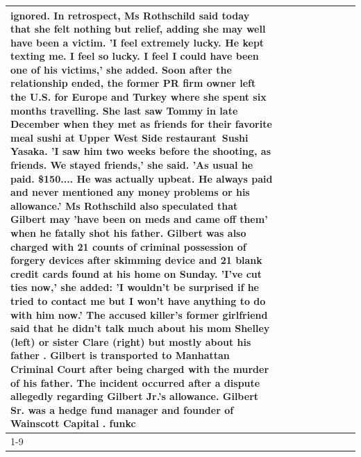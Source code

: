 \begin{table}[H]
\begin{tabular}{lllrlllll}
ignored. In retrospect, Ms Rothschild said today that she felt nothing but relief, adding she may well have been a victim. 'I feel extremely lucky. He kept texting me. I feel so lucky. I feel I could have been one of his victims,' she added. Soon after the relationship ended, the former PR firm owner left the U.S. for Europe and Turkey where she spent six months  travelling. She last saw Tommy in late December when they met as friends for their favorite meal sushi at Upper West Side restaurant Sushi Yasaka. 'I saw him two weeks before the shooting, as friends. We stayed friends,' she said. 'As usual he paid. \$150.... He was actually upbeat. He always paid and never mentioned any money problems or his allowance.' Ms Rothschild also speculated that Gilbert may 'have been on meds and came off them' when he fatally shot his father. Gilbert was also charged with 21 counts of criminal possession of forgery devices after skimming device and 21 blank credit cards found at his home on Sunday. 'I've cut ties now,' she added: 'I wouldn’t be surprised if he tried to contact me but I won’t have anything to do with him now.' The accused killer's former girlfriend said that he didn't talk much about his mom Shelley (left) or sister Clare (right) but mostly about his father . Gilbert is transported to Manhattan Criminal Court  after being charged with the murder of his father. The incident occurred after a dispute allegedly regarding Gilbert Jr.'s allowance. Gilbert Sr. was a hedge fund manager and founder of Wainscott Capital . funkc \\
\cline{1-9}

\end{tabular}
\end{table}
